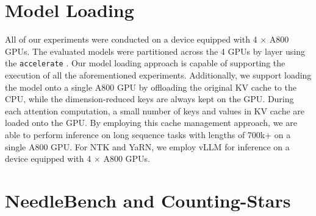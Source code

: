 
\section{Model Loading}
\label{sec:load_model_appendix}
All of our experiments were conducted on a device equipped with 4 $\times$ A800 GPUs. The evaluated models were partitioned across the 4 GPUs by layer using the \texttt{accelerate} \citep{accelerate}. Our model loading approach is capable of supporting the execution of all the aforementioned experiments. 
Additionally, we support loading the model onto a single A800 GPU by offloading the original KV cache to the CPU, while the dimension-reduced keys are always kept on the GPU. 
During each attention computation, a small number of keys and values in KV cache are loaded onto the GPU. 
By employing this cache management approach, we are able to perform inference on long sequence tasks with lengths of 700k+ on a single A800 GPU.
For NTK and YaRN, we employ vLLM \citep{kwon2023efficient} for inference on a device equipped with 4 $\times$ A800 GPUs.

\section{NeedleBench and Counting-Stars}
\label{sec:NeedleBench and Counting-Stars}

